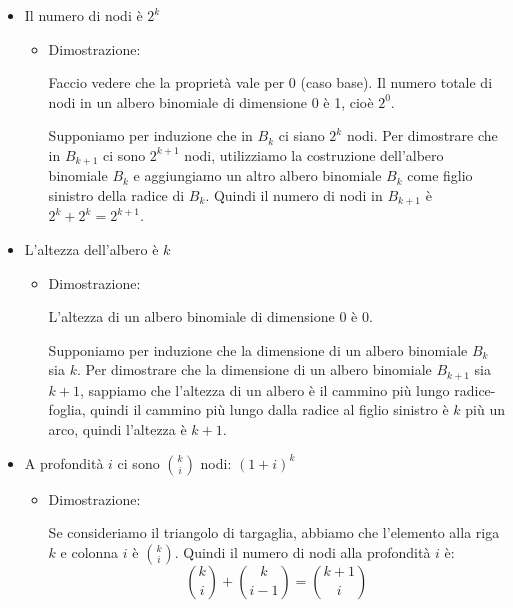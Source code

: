 \documentclass[a4paper]{article}
\begin{document}
\begin{theorem}
  \begin{itemize}
    \item Il numero di nodi è \( 2^k \)
      \begin{itemize}
        \item Dimostrazione:

          \vspace{1em}
          \noindent
          Faccio vedere che la proprietà vale per 0 (caso base). Il numero totale di
          nodi in un albero binomiale di dimensione 0 è 1, cioè \( 2^0 \).

          Supponiamo per induzione che in \( B_k \) ci siano \( 2^k \) nodi.
          Per dimostrare che in \( B_{k+1} \) ci sono \( 2^{k+1} \) nodi, utilizziamo
          la costruzione dell'albero binomiale \( B_k \) e aggiungiamo un altro albero
          binomiale \( B_k \) come figlio sinistro della radice di \( B_k \). Quindi
          il numero di nodi in \( B_{k+1} \) è \( 2^k + 2^k = 2^{k+1} \).
      \end{itemize}
    \item L'altezza dell'albero è \( k \)
      \begin{itemize}
        \item Dimostrazione:
          
          \vspace{1em}
          \noindent
          L'altezza di un albero binomiale di dimensione 0 è 0. 

          Supponiamo per induzione che la dimensione di un albero binomiale \( B_k \)
          sia \( k \). Per dimostrare che la dimensione di un albero binomiale \( B_{k+1} \)
          sia \( k+1 \), sappiamo che l'altezza di un albero è il cammino più lungo
          radice-foglia, quindi il cammino più lungo dalla radice al figlio sinistro
          è \( k \) più un arco, quindi l'altezza è \( k+1 \).
      \end{itemize}
    \item A profondità \( i \) ci sono \( \binom{k}{i} \) nodi: \( (1+i)^k \)
      \begin{itemize}
        \item Dimostrazione:

          \vspace{1em}
          \noindent
          Se consideriamo il triangolo di targaglia, abbiamo che l'elemento alla riga
          \( k \) e colonna \( i \) è \( \binom{k}{i} \). Quindi il numero di nodi
          alla profondità \( i \) è:
          \[
            \binom{k}{i} + \binom{k}{i-1} = \binom{k+1}{i}
          \] 


\end{itemize}
\end{itemize}
\end{theorem}
\end{document}

